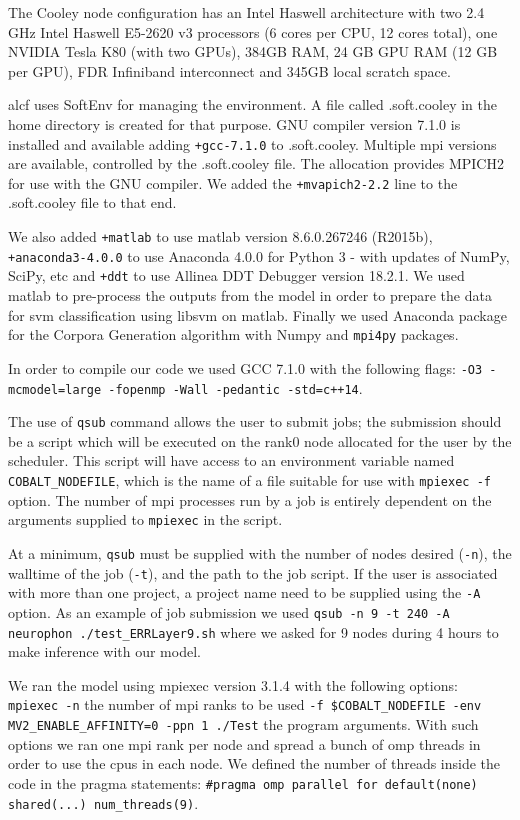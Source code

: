 {The Cooley node configuration has an Intel Haswell architecture with two 2.4 GHz Intel Haswell E5-2620 v3 processors (6 cores per CPU, 12 cores total), one NVIDIA Tesla K80 (with two GPUs), 384GB RAM, 24 GB GPU RAM (12 GB per GPU), FDR Infiniband interconnect and 345GB local scratch space.

\gls{alcf} uses SoftEnv for managing the environment. A file called .soft.cooley in the home directory is created for that purpose. GNU compiler version 7.1.0 is installed and available adding \texttt{+gcc-7.1.0} to .soft.cooley. Multiple \gls{mpi} versions are available, controlled by the .soft.cooley file. The allocation provides MPICH2 for use with the GNU compiler. We added the \texttt{+mvapich2-2.2} line to the .soft.cooley file to that end.

We also added \texttt{+matlab} to use matlab version 8.6.0.267246 (R2015b), \texttt{+anaconda3-4.0.0} to use Anaconda 4.0.0 for Python 3 - with updates of NumPy, SciPy, etc and \texttt{+ddt} to use Allinea DDT Debugger version 18.2.1. We used matlab to pre-process the outputs from the model in order to prepare the data for \gls{svm} classification using \gls{libsvm} on matlab. Finally we used Anaconda package for the Corpora Generation algorithm with Numpy and \texttt{mpi4py} packages.

In order to compile our code we used GCC 7.1.0 with the following flags: \texttt{-O3 -mcmodel=large -fopenmp -Wall -pedantic -std=c++14}.

The use of \texttt{qsub} command allows the user to submit jobs; the submission should be a script which will be executed on the rank0 node allocated for the user by the scheduler. This script will have access to an environment variable named \texttt{COBALT\_NODEFILE}, which is the name of a file suitable for use with \texttt{mpiexec -f} option. The number of \gls{mpi} processes run by a job is entirely dependent on the arguments supplied to \texttt{mpiexec} in the script.

At a minimum, \texttt{qsub} must be supplied with the number of nodes desired (\texttt{-n}), the walltime of the job (\texttt{-t}), and the path to the job script.  If the user is associated with more than one project, a project name need to be supplied using the \texttt{-A} option. As an example of job submission we used \texttt{qsub -n 9 -t 240 -A neurophon ./test\_ERRLayer9.sh} where we asked for 9 nodes during 4 hours to make inference with our model.

We ran the model using mpiexec version 3.1.4 with the following options: \texttt{mpiexec -n} the number of \gls{mpi} ranks to be used \texttt{-f \$COBALT\_NODEFILE -env MV2\_ENABLE\_AFFINITY=0 -ppn 1 ./Test} the program arguments. With such options we ran one \gls{mpi} rank per node and spread a bunch of \gls{omp} threads in order to use the \glspl{cpu} in each node. We defined the number of threads inside the code in the pragma statements: \texttt{\#pragma omp parallel for default(none) shared(...) num\_threads(9)}.
}









